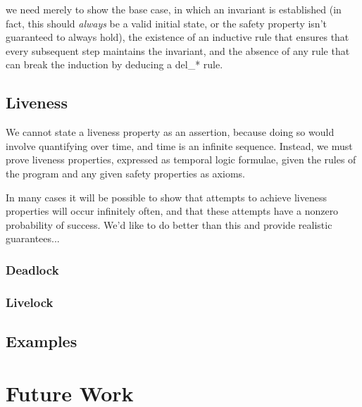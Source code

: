 \documentclass{acm_proc_article-sp-sigmod09}
\begin{document}
we need merely to show the base case, in which an invariant is established (in fact, this should \emph{always} be a valid 
initial state, or the safety property isn't guaranteed to always hold), the existence of an inductive rule that ensures that every 
subsequent step maintains the invariant, and the absence of any rule that can break the induction by deducing a del\_* rule.

\subsection{Liveness}

We cannot state a liveness property as an assertion, because doing so would involve quantifying over time,
and time is an infinite sequence.  Instead, we must prove liveness properties, expressed as temporal logic
formulae, given the rules of the program and any given safety properties as axioms.

In many cases it will be possible to show that attempts to achieve liveness properties will occur infinitely often, and that
these attempts have a nonzero probability of success.  We'd like to do better than this and provide realistic guarantees...

\subsubsection{Deadlock}



\subsubsection{Livelock}

\subsection{Examples}

\section{Future Work}


\end{document}
